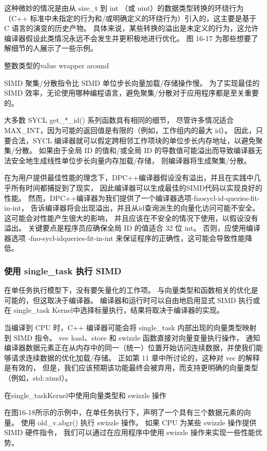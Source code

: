 这种微妙的情况是由从 size\_t 到 int （或 uint）的数据类型转换的环绕行为
（C++ 标准中未指定的行为和/或明确定义的环绕行为）引入的，这主要是基于 C 语言的演变的历史产物。 
具体来说，某些转换的溢出是未定义的行为，这允许编译器假设此类情况永远不会发生并更积极地进行优化。 
图 16-17 为那些想要了解细节的人展示了一些示例。

{\color{red} 整数类型的value wrapper around}

SIMD 聚集/分散指令比 SIMD 单位步长向量加载/存储操作慢。 
为了实现最佳的 SIMD 效率，无论使用哪种编程语言，避免聚集/分散对于应用程序都是至关重要的。

大多数 SYCL get\_*\_id() 系列函数具有相同的细节，
尽管许多情况适合 MAX\_INT，因为可能的返回值是有限的（例如，工作组内的最大 id）。 
因此，只要合法，SYCL 编译器就可以假定跨相邻工作项块的单位步长内存地址，以避免聚集/分散。 
如果由于全局 ID 的值和/或全局 ID 的导数值可能溢出而导致编译器无法安全地生成线性单位步长向量内存加载/存储，
则编译器将生成聚集/分散。

在为用户提供最佳性能的理念下，DPC++编译器假设没有溢出，并且在实践中几乎所有时间都捕捉到了现实，
因此编译器可以生成最佳的SIMD代码以实现良好的性能。 
然而，DPC++编译器为我们提供了一个编译器选项-fnosycl-id-queries-fit-in-int，
告诉编译器将会出现溢出，并且从id查询派生的向量化访问可能不安全。 这可能会对性能产生很大的影响，
并且应该在不安全的情况下使用，以假设没有溢出。 关键要点是程序员应确保全局 ID 的值适合 32 位 int。 
否则，应使用编译器选项 -fno-sycl-idqueries-fit-in-int 来保证程序的正确性，这可能会导致性能降低。

\subsubsection{使用 single\_task 执行 SIMD}
在单任务执行模型下，没有要矢量化的工作项。 与向量类型和函数相关的优化是可能的，但这取决于编译器。 
编译器和运行时可以自由地启用显式 SIMD 执行或在 single\_task Kernel中选择标量执行，结果将取决于编译器的实现。

当编译到 CPU 时，C++ 编译器可能会将 single\_task 内部出现的向量类型映射到 SIMD 指令。 
vec load、store 和 swizzle 函数直接对向量变量执行操作，
通知编译器数据元素正在从内存中的同一（统一）位置开始访问连续数据，并使我们能够请求连续数据的优化加载/存储。 
正如第 11 章中所讨论的，这种对 vec 的解释是有效的，
但是，我们应该预期该功能最终会被弃用，而支持更明确的向量类型（例如，std::simd）。

{\color{red} 在single\_taskKernel中使用向量类型和 swizzle 操作}

在图16-18所示的示例中，在单任务执行下，声明了一个具有三个数据元素的向量。 
使用 old\_v.abgr() 执行 swizzle 操作。 如果 CPU 为某些 swizzle 操作提供 SIMD 硬件指令，
我们可以通过在应用程序中使用 swizzle 操作来实现一些性能优势。

